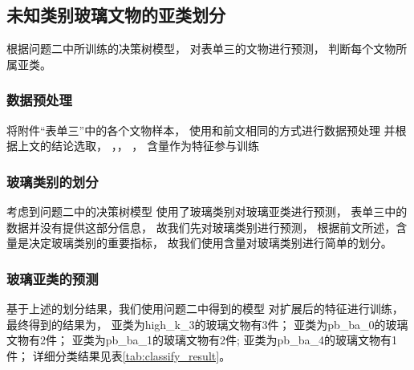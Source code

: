 \subsection{未知类别玻璃文物的亚类划分}
根据问题二中所训练的决策树模型，
对表单三的文物进行预测，
判断每个文物所属亚类。


\subsubsection{数据预处理}
将附件``表单三''中的各个文物样本，
使用和前文相同的方式进行数据预处理
并根据上文的结论选取， ，， ，
含量作为特征参与训练

\subsubsection{玻璃类别的划分}
考虑到问题二中的决策树模型
使用了玻璃类别对玻璃亚类进行预测，
表单三中的数据并没有提供这部分信息，
故我们先对玻璃类别进行预测，
根据前文所述，含量是决定玻璃类别的重要指标，
故我们使用含量对玻璃类别进行简单的划分。


\subsubsection{玻璃亚类的预测}
基于上述的划分结果，我们使用问题二中得到的模型
对扩展后的特征进行训练，最终得到的结果为，
亚类为high\_k\_3的玻璃文物有3件；
亚类为pb\_ba\_0的玻璃文物有2件；
亚类为pb\_ba\_1的玻璃文物有2件;
亚类为pb\_ba\_4的玻璃文物有1件；
详细分类结果见表\ref{tab:classify_result}。

